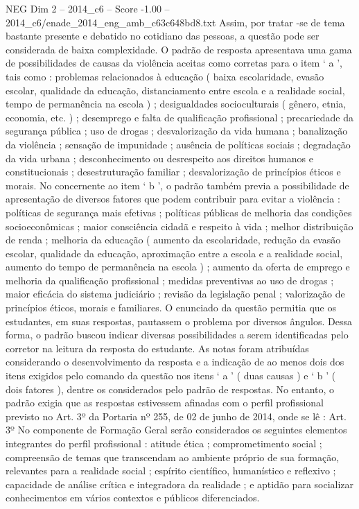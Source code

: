 \begin{textsample}{NEG Dim 2 – 2014\_c6 – Score -1.00 – 2014\_c6/enade\_2014\_eng\_amb\_c63c648bd8.txt}
Assim, por tratar -se de tema bastante presente e debatido no cotidiano das pessoas, a questão pode ser considerada de baixa complexidade.
O padrão de resposta apresentava uma gama de possibilidades de causas da violência aceitas como corretas para o item ‘ a ’, tais como : problemas relacionados à educação ( baixa escolaridade, evasão escolar, qualidade da educação, distanciamento entre escola e a realidade social, tempo de permanência na escola ) ; desigualdades socioculturais ( gênero, etnia, economia, etc. ) ; desemprego e falta de qualificação profissional ; precariedade da segurança pública ; uso de drogas ; desvalorização da vida humana ; banalização da violência ; sensação de impunidade ; ausência de políticas sociais ; degradação da vida urbana ; desconhecimento ou desrespeito aos direitos humanos e constitucionais ; desestruturação familiar ; desvalorização de princípios éticos e morais.
No concernente ao item ‘ b ’, o padrão também previa a possibilidade de apresentação de diversos fatores que podem contribuir para evitar a violência : políticas de segurança mais efetivas ; políticas públicas de melhoria das condições socioeconômicas ; maior consciência cidadã e respeito à vida ; melhor distribuição de renda ; melhoria da educação ( aumento da escolaridade, redução da evasão escolar, qualidade da educação, aproximação entre a escola e a realidade social, aumento do tempo de permanência na escola ) ; aumento da oferta de emprego e melhoria da qualificação profissional ; medidas preventivas ao uso de drogas ; maior eficácia do sistema judiciário ; revisão da legislação penal ; valorização de princípios éticos, morais e familiares.
O enunciado da questão permitia que os estudantes, em suas respostas, pautassem o problema por diversos ângulos.
Dessa forma, o padrão buscou indicar diversas possibilidades a serem identificadas pelo corretor na leitura da resposta do estudante.
As notas foram atribuídas considerando o desenvolvimento da resposta e a indicação de ao menos dois dos itens exigidos pelo comando da questão nos itens ‘ a ’ ( duas causas ) e ‘ b ’ ( dois fatores ), dentre os considerados pelo padrão de respostas.
No entanto, o padrão exigia que as respostas estivessem afinadas com o perfil profissional previsto no Art. 3º da Portaria nº 255, de 02 de junho de 2014, onde se lê : Art. 3º No componente de Formação Geral serão considerados os seguintes elementos integrantes do perfil profissional : atitude ética ; comprometimento social ; compreensão de temas que transcendam ao ambiente próprio de sua formação, relevantes para a realidade social ; espírito científico, humanístico e reflexivo ; capacidade de análise crítica e integradora da realidade ; e aptidão para socializar conhecimentos em vários contextos e públicos diferenciados.

\end{textsample}
